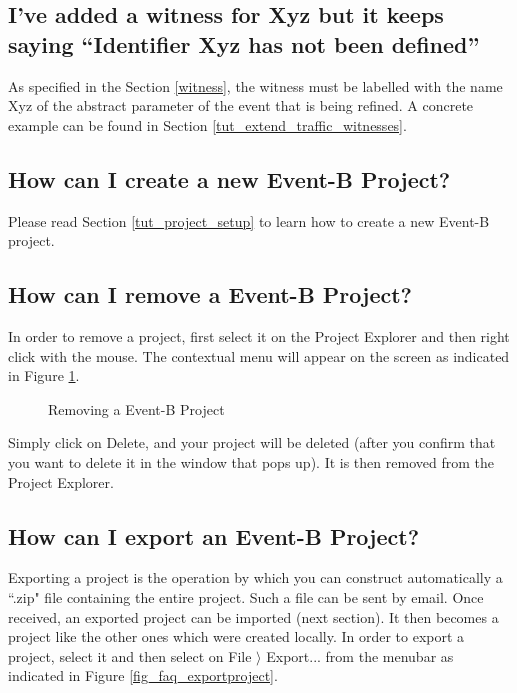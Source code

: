 \subsection{I've added a witness for \textsf{Xyz} but it keeps saying ``Identifier \textsf{Xyz} has not been defined''}

As specified in the Section \ref{witness}, the witness must be labelled with the name \textsf{Xyz} of the abstract parameter of the event that is being refined. A concrete example can be found in Section \ref{tut_extend_traffic_witnesses}.

\subsection{How can I create a new Event-B Project?}

Please read Section \ref{tut_project_setup} to learn how to create a new Event-B project.

\subsection{How can I remove a Event-B Project?}

In order to remove a project, first select it on the \textsf{Project Explorer} and then right click with the mouse. The contextual menu will appear on the screen as indicated in Figure \ref{fig_faq_removeproject}.

\begin{figure}[!ht]
\begin{center}
	\caption{Removing a Event-B Project}
	\label{fig_faq_removeproject}
\end{center}
\end{figure}

Simply click on \textsf{Delete}, and your project will be deleted (after you confirm that you want to delete it in the window that pops up). It is then removed from the \textsf{Project Explorer}.

\subsection{How can I export an Event-B Project?}

Exporting a project is the operation by which you can construct automatically a ``.zip" file containing the entire project. Such a file can be sent by email. Once received, an exported project can be imported (next section). It then becomes a project like the other ones which were created locally. In order to export a project, select it and then select on \textsf{File $\rangle$ Export...} from the menubar as indicated in Figure \ref{fig_faq_exportproject}. 

